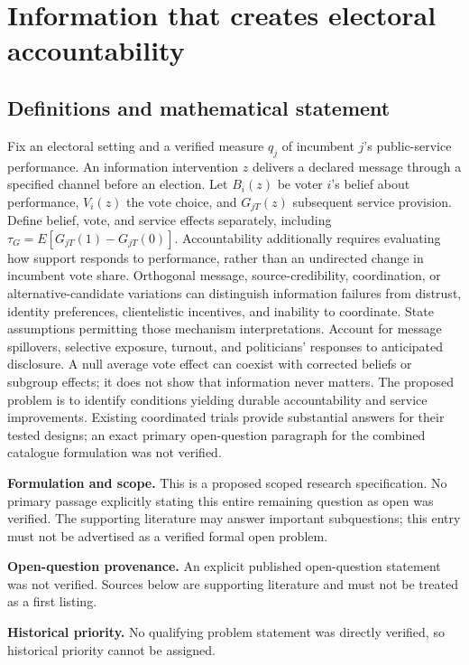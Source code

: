 \documentclass[11pt]{article}
\begin{document}
\section*{Information that creates electoral accountability}\label{30007669}
\subsection{Definitions and mathematical statement}
Fix an electoral setting and a verified measure \(q_j\) of incumbent \(j\)'s public-service performance. An information intervention \(z\) delivers a declared message through a specified channel before an election. Let \(B_i(z)\) be voter \(i\)'s belief about performance, \(V_i(z)\) the vote choice, and \(G_{jT}(z)\) subsequent service provision. Define belief, vote, and service effects separately, including \(\tau_G=E[G_{jT}(1)-G_{jT}(0)]\). Accountability additionally requires evaluating how support responds to performance, rather than an undirected change in incumbent vote share. Orthogonal message, source-credibility, coordination, or alternative-candidate variations can distinguish information failures from distrust, identity preferences, clientelistic incentives, and inability to coordinate. State assumptions permitting those mechanism interpretations. Account for message spillovers, selective exposure, turnout, and politicians' responses to anticipated disclosure. A null average vote effect can coexist with corrected beliefs or subgroup effects; it does not show that information never matters. The proposed problem is to identify conditions yielding durable accountability and service improvements. Existing coordinated trials provide substantial answers for their tested designs; an exact primary open-question paragraph for the combined catalogue formulation was not verified.

\par\textbf{Formulation and scope.} This is a proposed scoped research specification. No primary passage explicitly stating this entire remaining question as open was verified. The supporting literature may answer important subquestions; this entry must not be advertised as a verified formal open problem.

\par\textbf{Open-question provenance.} An explicit published open-question statement was not verified. Sources below are supporting literature and must not be treated as a first listing.

\par\textbf{Historical priority.} No qualifying problem statement was directly verified, so historical priority cannot be assigned.
\end{document}
